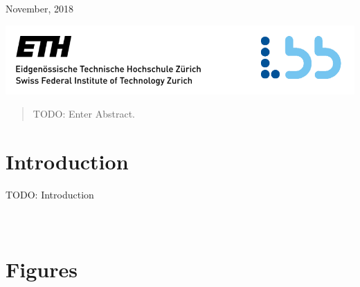 \begin{titlepage}

{\large November, 2018}\\[2cm] %

\centerline{\includegraphics[scale=0.9]{ETH_LBB.PNG}}


 

\vfill %

\end{titlepage}


\begin{abstract}
TODO: Enter Abstract.
\end{abstract}

\newpage

\tableofcontents

\newpage

\section{Introduction}

TODO: Introduction 






\clearpage
{}
\appendix
\section{\\Figures}


